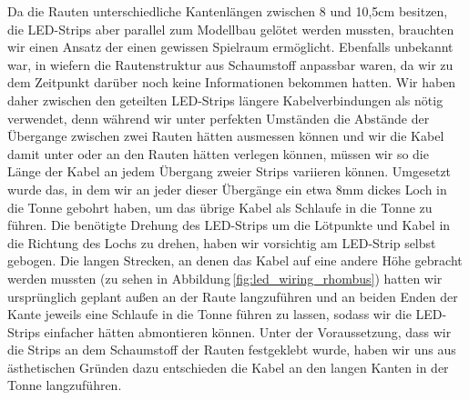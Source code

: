         Da die Rauten unterschiedliche Kantenlängen zwischen 8 und 10,5cm besitzen, die LED-Strips aber parallel zum Modellbau gelötet werden mussten, brauchten wir einen Ansatz der einen gewissen Spielraum ermöglicht. Ebenfalls unbekannt war, in wiefern die Rautenstruktur aus Schaumstoff anpassbar waren, da wir zu dem Zeitpunkt darüber noch keine Informationen bekommen hatten.
        Wir haben daher zwischen den geteilten LED-Strips längere Kabelverbindungen als nötig verwendet, denn während wir unter perfekten Umständen die Abstände der Übergange zwischen zwei Rauten hätten ausmessen können und wir die Kabel damit unter oder an den Rauten hätten verlegen können, müssen wir so die Länge der Kabel an jedem Übergang zweier Strips variieren können.
        Umgesetzt wurde das, in dem wir an jeder dieser Übergänge ein etwa 8mm dickes Loch in die Tonne gebohrt haben, um das übrige Kabel als Schlaufe in die Tonne zu führen. Die benötigte Drehung des LED-Strips um die Lötpunkte und Kabel in die Richtung des Lochs zu drehen, haben wir vorsichtig am LED-Strip selbst gebogen.
        Die langen Strecken, an denen das Kabel auf eine andere Höhe gebracht  werden mussten (zu sehen in Abbildung\,\ref{fig:led_wiring_rhombus}) hatten wir ursprünglich geplant außen an der Raute langzuführen und an beiden Enden der Kante jeweils eine Schlaufe in die Tonne führen zu lassen, sodass wir die LED-Strips einfacher hätten abmontieren können.
        Unter der Voraussetzung, dass wir die Strips an dem Schaumstoff der Rauten festgeklebt wurde, haben wir uns aus ästhetischen Gründen dazu entschieden die Kabel an den langen Kanten in der Tonne langzuführen.

